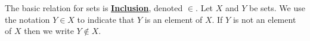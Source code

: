 \newcommand{\SetInclusion}[0]{\textbf{\hyperref[def:SetInclusion]{Inclusion}}\xspace}
\begin{df}[$\in$]
\label{def:SetInclusion}

\rm
    The basic relation for sets is \SetInclusion, denoted $\in$.
    Let $X$ and $Y$ be sets. 
    We use the notation $Y \in X$ to indicate 
    that $Y$ is an element of $X$. 
    If $Y$ is not an element of $X$ then we write
    $Y \not \in X$. 
\end{df}
